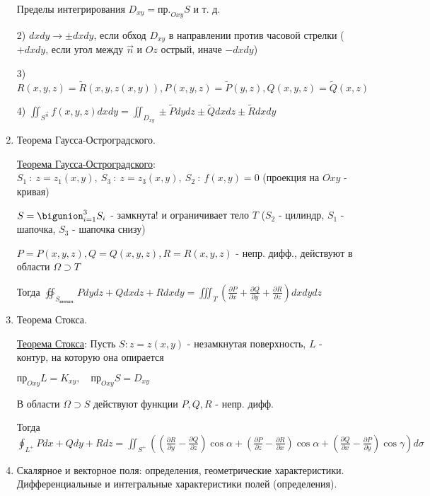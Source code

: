 \documentclass[12pt]{article}
\begin{document}
\begin{enumerate}
        Пределы интегрирования $D_{xy} = \text{пр.}_{Oxy} S$ и т. д.

        2) $dxdy \to \pm dxdy$, если обход $D_{xy}$ в направлении против часовой стрелки ($+dxdy$, если угол между $\overrightarrow{n}$ и $Oz$ острый, иначе $-dxdy$)

        3) $R(x, y, z) = \tilde{R}(x, y, z(x, y)), P(x, y, z) = \tilde{P}(y, z), Q(x, y, z) = \tilde{Q}(x, z)$

        4) $\iint_{S^{\overrightarrow{n}}} f(x, y, z) dxdy = \iint_{D_{xy}} \pm \tilde{P}dydz \pm \tilde{Q}dxdz \pm \tilde{R}dxdy$

        \item Теорема Гаусса-Остроградского.

        \hyperlink{theoremGaussOstrogradskyy}{Теорема Гаусса-Остроградского}:
        $S_1\ : \ z = z_1(x, y),\ S_3\ :\ z = z_3(x, y),\ S_2\ : \ f(x, y) = 0$ (проекция на $Oxy$ - кривая)

        $S = \bigunion_{i = 1}^3 S_i$ - замкнута! и ограничивает тело $T$ ($S_2$ - цилиндр, $S_1$ - шапочка, $S_3$ - шапочка снизу)

        $P = P(x, y, z), Q = Q(x, y, z), R = R(x, y, z)$ - непр. дифф., действуют в области $\Omega \supset T$

        Тогда $\oiint_{S_{\text{внешн.}}} Pdydz + Qdxdz + Rdxdy = \iiint_T \left(\frac{\partial P}{\partial x} + \frac{\partial Q}{\partial y} + \frac{\partial R}{\partial z}\right) dxdydz$


        \item Теорема Стокса.

        \hyperlink{theoremStokes}{Теорема Стокса}: Пусть $S : z = z(x, y)$ - незамкнутая поверхность, $L$ - контур, на которую она опирается

        $\text{пр}_{Oxy} L = K_{xy}, \quad \text{пр}_{Oxy} S = D_{xy}$

        В области $\Omega \supset S$ действуют функции $P, Q, R$ - непр. дифф.

        Тогда $\oint_{L^+} Pdx + Qdy + Rdz = \iint_{S^+} \left(\left(\frac{\partial R}{\partial y} - \frac{\partial Q}{\partial z}\right)\cos\alpha +
        \left(\frac{\partial P}{\partial z} - \frac{\partial R}{\partial x}\right)\cos\alpha + \left(\frac{\partial Q}{\partial x} - \frac{\partial P}{\partial y}\right)\cos\gamma\right) d\sigma$


        \item Скалярное и векторное поля: определения, геометрические характеристики. Дифференциальные и интегральные характеристики полей (определения).


\end{enumerate}
\end{document}

